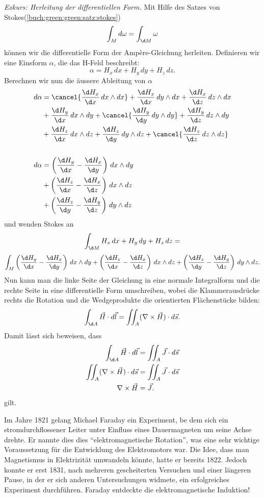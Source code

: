 \textit{Exkurs: Herleitung der differentiellen Form.}
Mit Hilfe des Satzes von Stokes(\ref{buch:green:green:satz:stokes})
\[
\int_{M} d\omega
=
\int_{\d M} \omega
\]
können wir die differentielle Form der Ampère-Gleichung herleiten.
Definieren wir eine Einsform $\alpha$, die das H-Feld beschreibt:
\[
\alpha
=
H_x \, dx + H_y \, dy + H_z \, dz . 
\]
Berechnen wir nun die äussere Ableitung von $\alpha$
\begin{align*}
	d\alpha 
	&=
	\cancel{\frac{\d H_x}{\d x} \, dx \wedge dx} + \frac{\d H_x}{\d x} \, dy \wedge dx + \frac{\d H_x}{\d z} \, dz \wedge dx
	\\
	&+
	\frac{\d H_y}{\d x} \, dx \wedge dy + \cancel{\frac{\d H_y}{\d y} \, dy \wedge dy} + \frac{\d H_y}{\d z} \, dz \wedge dy
	\\
	&+
	\frac{\d H_z}{\d x} \, dx \wedge dz + \frac{\d H_z}{\d y} \, dy \wedge dz + \cancel{\frac{\d H_z}{\d z} \, dz \wedge dz}
	\\
	\\
	d\alpha
	&=
	\left(\frac{\d H_y}{\d x} - \frac{\d H_x}{\d y}\right) \, dx \wedge dy
	\\
	&+
	\left(\frac{\d H_z}{\d x} - \frac{\d H_x}{\d z}\right) \, dx \wedge dz
	\\
	&+
	\left(\frac{\d H_z}{\d y} - \frac{\d H_y}{\d z}\right) \, dy \wedge dz
\end{align*}
und wenden Stokes an
\[
\int_{\d M} H_x \, dx + H_y \, dy + H_z \, dz
=
\]
\[
\int_{M} \left(\frac{\d H_y}{\d x} - \frac{\d H_x}{\d y}\right) \, dx \wedge dy
+
\left(\frac{\d H_z}{\d x} - \frac{\d H_x}{\d z}\right) \, dx \wedge dz
+
\left(\frac{\d H_z}{\d y} - \frac{\d H_y}{\d z}\right) \, dy \wedge dz .
\]
Nun kann man die linke Seite der Gleichung in eine normale Integralform und die rechte Seite in eine differentielle Form umschreiben, wobei die Klammerausdrücke rechts die Rotation und die Wedgeprodukte die orientierten Flächenstücke bilden: 
\[
\int_{\d A} \vec{H} \cdot d\vec{l}
=
\iint_{A} (\nabla \times \vec{H}) \cdot d\vec{s} .
\]
Damit lässt sich beweisen, dass
\begin{align*}
	\int_{\d A}
	\vec{H} \cdot d\vec{l}
	&=
	\iint_{A}
	\vec{J} \cdot d\vec{s}
	\\
	\iint_{A}
	(
	\nabla \times \vec{H}
	)
	\cdot
	d\vec{s}
	&=
	\iint_{A}
	\vec{J} \cdot d\vec{s}
	\\
	\nabla \times \vec{H}
	&=
	\vec{J} .
\end{align*}
gilt.


Im Jahre 1821 gelang Michael Faraday ein Experiment, be dem sich ein stromdurchflossener Leiter unter Einfluss eines Dauermagneten um seine Achse drehte.
Er nannte dies dies ``elektromagnetische Rotation'', was eine sehr wichtige Voraussetzung für die Entwicklung des Elektromotors war.
Die Idee, dass man Magnetismus in Elektrizität umwandeln könnte, hatte er bereits 1822.
Jedoch konnte er erst 1831, nach mehreren gescheiterten Versuchen und einer längeren Pause, in der er sich anderen Untersuchungen widmete, ein erfolgreiches Experiment durchführen.
Faraday entdeckte die elektromagnetische Induktion!

